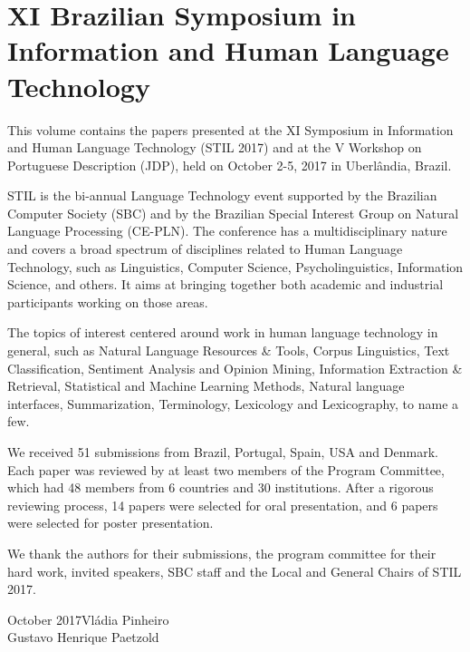
\section*{XI Brazilian Symposium in Information and Human Language Technology}

This volume contains the papers presented at the XI Symposium in
Information and Human Language Technology (STIL 2017) and at the V
Workshop on Portuguese Description (JDP), held on October 2-5, 2017
in Uberl\^andia, Brazil.

STIL is the bi-annual Language Technology event supported by the
Brazilian Computer Society (SBC) and by the Brazilian Special Interest
Group on Natural Language Processing (CE-PLN). The conference has a
multidisciplinary nature and covers a broad spectrum of disciplines
related to Human Language Technology, such as Linguistics, Computer
Science, Psycholinguistics, Information Science, and others. It aims
at bringing together both academic and industrial participants working
on those areas.

The topics of interest centered around work in human language
technology in general, such as Natural Language Resources \& Tools,
Corpus Linguistics, Text Classification, Sentiment Analysis and
Opinion Mining, Information Extraction \& Retrieval, Statistical and
Machine Learning Methods, Natural language interfaces, Summarization,
Terminology, Lexicology and Lexicography, to name a few.

We received 51 submissions from Brazil, Portugal, Spain, USA and
Denmark. Each paper was reviewed by at least two members of the
Program Committee, which had 48 members from 6 countries and 30
institutions. After a rigorous reviewing process, 14 papers were
selected for oral presentation, and 6 papers were selected for poster
presentation.

We thank the authors for their submissions, the program committee for
their hard work, invited speakers, SBC staff and the Local and General
Chairs of STIL 2017.

\vspace{0.5cm}
\begin{flushright}\noindent
October 2017\hfill Vl\'adia Pinheiro\\Gustavo Henrique Paetzold
\end{flushright}
